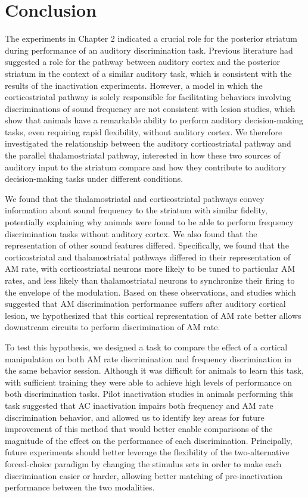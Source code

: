 \chapter{Conclusion}

The experiments in Chapter 2 indicated a crucial role for the posterior striatum during performance of an auditory discrimination task. 
%
Previous literature had suggested a role for the pathway between auditory cortex and the posterior striatum in the context of a similar auditory task, which is consistent with the results of the inactivation experiments.
%
However, a model in which the corticostriatal pathway is solely responsible for facilitating behaviors involving discriminations of sound frequency are not consistent with lesion studies, which show that animals have a remarkable ability to perform auditory decision-making tasks, even requiring rapid flexibility, without auditory cortex. 
%
We therefore investigated the relationship between the auditory corticostriatal pathway and the parallel thalamostriatal pathway, interested in how these two sources of auditory input to the striatum compare and how they contribute to auditory decision-making tasks under different conditions. 

We found that the thalamostriatal and corticostriatal pathways convey information about sound frequency to the striatum with similar fidelity, potentially explaining why animals were found to be able to perform frequency discrimination tasks without auditory cortex. 
%
We also found that the representation of other sound features differed. 
%
Specifically, we found that the corticostriatal and thalamostriatal pathways differed in their representation of AM rate, with corticostriatal neurons more likely to be tuned to particular AM rates, and less likely than thalamostriatal neurons to synchronize their firing to the envelope of the modulation.
%
Based on these observations, and studies which suggested that AM discrimination performance suffers after auditory cortical lesion, we hypothesized that this cortical representation of AM rate better allows downstream circuits to perform discrimination of AM rate.

To test this hypothesis, we designed a task to compare the effect of a cortical manipulation on both AM rate discrimination and frequency discrimination in the same behavior session. 
%
Although it was difficult for animals to learn this task, with sufficient training they were able to achieve high levels of performance on both discrimination tasks. 
%
Pilot inactivation studies in animals performing this task suggested that AC inactivation impairs both frequency and AM rate discrimination behavior, and allowed us to identify key areas for future improvement of this method that would better enable comparisons of the magnitude of the effect on the performance of each discrimination. 
%
Principally, future experiments should better leverage the flexibility of the two-alternative forced-choice paradigm by changing the stimulus sets in order to make each discrimination easier or harder, allowing better matching of pre-inactivation performance between the two modalities.
%



